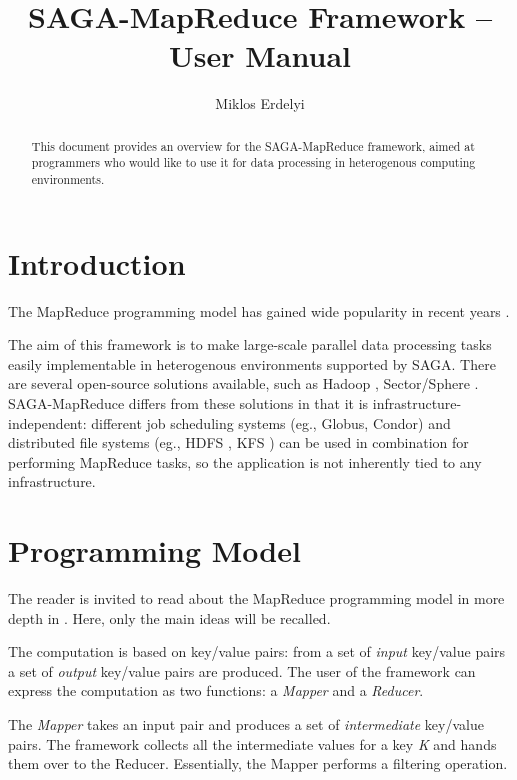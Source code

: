 \documentclass{article}
\begin{document}
\title{SAGA-MapReduce Framework -- User Manual}
\author{Miklos Erdelyi \footnotemark}
\maketitle


\begin{abstract}

  This document provides an overview for the SAGA-MapReduce framework,
  aimed at programmers who would like to use it for data processing in
  heterogenous computing environments.

\end{abstract}

\tableofcontents

\section{Introduction}

The MapReduce programming model has gained wide popularity in recent years \cite{mapreduce, hadoop}.

The aim of this framework is to make large-scale parallel data processing tasks easily implementable in heterogenous environments supported by SAGA. There are several open-source solutions available, such as Hadoop \cite{hadoop}, Sector/Sphere \cite{sector}. SAGA-MapReduce differs from these solutions in that it is infrastructure-independent: different job scheduling systems (eg., Globus, Condor) and distributed file systems (eg., HDFS \cite{hdfs}, KFS \cite{kfs}) can be used in combination for performing MapReduce tasks, so the application is not inherently tied to any infrastructure.


\section{Programming Model}

The reader is invited to read about the MapReduce programming model in more depth in \cite{mapreduce}. Here, only the main ideas will be recalled.

The computation is based on key/value pairs: from a set of \emph{input} key/value pairs a set of \emph{output} key/value pairs are produced. The user of the framework can express the computation as two functions: a \emph{Mapper} and a \emph{Reducer}.

The \emph{Mapper} takes an input pair and produces a set of \emph{intermediate} key/value pairs. The framework collects all the intermediate values for a key \emph{K} and hands them over to the Reducer. Essentially, the Mapper performs a filtering operation.
\end{document}
